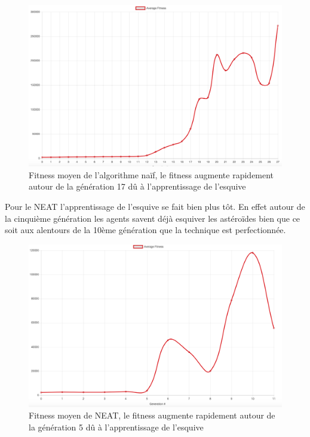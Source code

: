 \documentclass{article}
\begin{document}
\begin{figure}[H]
\begin{center}
	\includegraphics[scale=0.35]{mlpdodge.png}
	\caption{Fitness moyen de l'algorithme naïf, le fitness augmente rapidement autour de la génération 17 dû à l'apprentissage de l'esquive}
\end{center}
\end{figure}

Pour le NEAT l'apprentissage de l'esquive se fait bien plus tôt. En effet autour de la cinquième génération les agents savent déjà esquiver les astéroïdes bien que ce soit aux alentours de la 10ème génération que la technique est perfectionnée.

\begin{figure}[H]
\begin{center}
	\includegraphics[scale=0.35]{neatdodge.png}
	\caption{Fitness moyen de NEAT, le fitness augmente rapidement autour de la génération 5 dû à l'apprentissage de l'esquive}
\end{center}
\end{figure}
\end{document}

